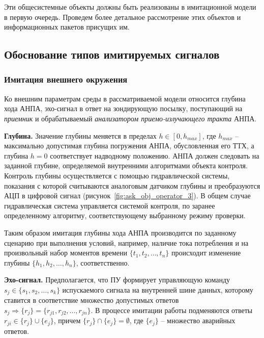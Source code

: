 Эти общесистемные объекты должны быть реализованы в имитационной модели в первую очередь.
Проведем более детальное рассмотрение этих объектов и информационных пакетов присущих им.




\subsection{Обоснование типов имитируемых сигналов}\label{sec:model_anpa_params}

\subsubsection{Имитация внешнего окружения}\label{sec:model_anpa:outer_params}
Ко внешним параметрам среды в рассматриваемой модели относится
глубина хода АНПА, эхо-сигнал в ответ на зондирующую посылку,
поступающий на \textit{приемник} и обрабатываемый \textit{анализатором приемо-излучающего тракта} АНПА.

\textbf{Глубина.}
Значение глубины меняется в пределах $h \in [0, h_{max}]$,
где $h_{max}$ -- максимально допустимая глубина погружения АНПА, обусловленная его ТТХ,
а глубина $h = 0$ соответствует надводному положению.
АНПА должен следовать на заданной глубине, определяемой внутренними алгоритмами объекта контроля.
Контроль глубины осуществляется с помощью гидравлической системы,
показания с которой считываются аналоговым датчиком глубины и преобразуются АЦП в цифровой сигнал (рисунок~\ref{fig:ask_obj_operator_3}).
В общем случае гидравлическая система управляется системой контроля,
по заранее определенному алгоритму, соответствующему выбранному режиму проверки.

Таким образом имитация глубины хода АНПА производится по заданному сценарию
при выполнения условий, например, наличие тока потребления
и на произвольный набор моментов времени $\{t_1, t_2, \ldots, t_n\}$
происходит изменение глубины $\{h_1, h_2, \ldots, h_n\}$, соответственно.


\textbf{Эхо-сигнал.}
Предполагается, что ПУ формирует управляющую команду $s_j \in \{s_1, s_2, \ldots, s_k\}$ испускаемого сигнала на внутренней шине данных,
которому ставится в соответствие множество допустимых ответов $s_j \Rightarrow \{r_j\} = \{r_{j1}, r_{j2}, \ldots, r_{jn}\}$.
В процессе имитации работы подменяются ответы
$r_{ji} \in \{r_j\} \cup \{e_j\}$, причем $\{r_j\} \cap \{e_j\} = \emptyset$,
где $\{e_j\}$ -- множество аварийных ответов.


